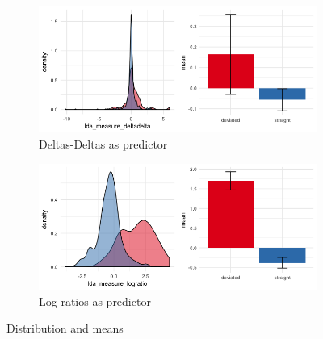 \documentclass{article}
\begin{document}
\begin{itemize}
\begin{figure}[h]
\begin{subfigure}{0.3\textwidth}
\includegraphics[width=\textwidth]{lda_deltadelta.png}
\caption{Deltas-Deltas as predictor}
\end{subfigure}
\begin{subfigure}{0.3\textwidth}
\includegraphics[width=\textwidth]{lda_logratio.png}
\caption{Log-ratios as predictor}
\end{subfigure}
\caption{Distribution and means}
\end{figure}




\end{itemize}
\end{document}
